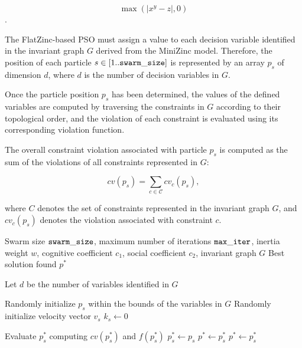 \[\max\left(|x^y - z|, 0\right)\].

The FlatZinc-based PSO must assign a value to each decision variable identified in the invariant graph $G$ derived from the MiniZinc model. Therefore, the position of each particle $s \in [1..\mathtt{swarm\_size}]$ is represented by an array $p_s$ of dimension $d$, where $d$ is the number of decision variables in $G$.

Once the particle position $p_s$ has been determined, the values of the defined variables are computed by traversing the constraints in $G$ according to their topological order, and the violation of each constraint is evaluated using its corresponding violation function.

The overall constraint violation associated with particle $p_s$ is computed as the sum of the violations of all constraints represented in $G$:

\[
cv(p_s)=\sum_{c\in\mathcal{C}}cv_c(p_s),
\]

\noindent where $C$ denotes the set of constraints represented in the invariant graph $G$, and $cv_c(p_s)$ denotes the violation associated with constraint $c$.

\begin{algorithm}[htbp]
	\footnotesize
	\caption{FlatZinc-Based Particle Swarm Optimization initialization phase}
	\label{alg:fzn_pso_pt1}
	\begin{algorithmic}[1]
		\Require Swarm size $\mathtt{swarm\_size}$, maximum number of iterations $\mathtt{max\_iter}$, inertia weight $w$, cognitive coefficient $c_1$, social coefficient $c_2$, invariant graph $G$
		\Ensure Best solution found $p^*$
		
		\State Let $d$ be the number of variables identified in $G$
		\label{alg:start_init}
		
		\State Randomly initialize $p_s$ within the bounds of the variables in $G$
		\State Randomly initialize velocity vector $v_s$
		\State $k_s\gets0$
		\label{alg:end_init}
		
		\State Evaluate $p_s^*$ computing $cv(p_s^*)$ and $f(p_s^*)$
		\label{alg:init_eval}
		\State $p_s^* \gets p_s$
		\label{alg:start_init_update}
		\State $p^*\gets p_s^*$
		\EndIf
		\State $p^*\gets p_s^*$
		\EndIf
		\label{alg:end_init_update}
		
		\EndFor
	\end{algorithmic}
\end{algorithm}

